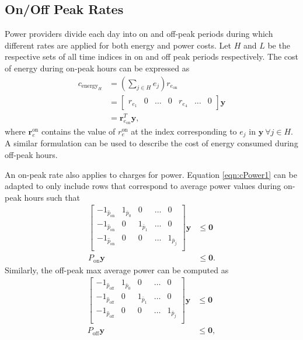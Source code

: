 \subsection{On/Off Peak Rates}
Power providers divide each day into on and off-peak periods during which different rates are applied for both energy and power costs. Let $H$ and $L$ be the respective sets of all time indices in on and off peak periods respectively. The cost of energy during on-peak hours can be expressed as 
\begin{equation}\label{eqn:cEnergy1}
	\begin{aligned}
		c_{\text{energy}_H} &= \left ( \sum_{j\in H} e_j \right ) r_{e_\text{on}} \\
		&= \begin{bmatrix}r_{e_1} & 0 & \hdots & 0 & r_{e_4} & \hdots & 0 \end{bmatrix}\mathbf{y} \\
		&= \mathbf{r}_{e_\text{on}}^T\mathbf{y},
	\end{aligned}
\end{equation}
where $\mathbf{r}^\text{on}_{e}$ contains the value of $r^\text{on}_{e}$ at the index corresponding to $e_j$ in $\mathbf{y} \ \forall j \in H$. A similar formulation can be used to describe the cost of energy consumed during off-peak hours.  
\par An on-peak rate also applies to charges for power. Equation \ref{eqn:cPower1} can be adapted to only include rows that correspond to average power values during on-peak hours such that
\begin{equation}\label{eqn:cPOnPeak} 
	\begin{aligned}
		 \begin{bmatrix} 
			 -1_{\hat{p}_\text{on}} & 1_{\bar{p}_0} & 0             & \hdots & 0 \\ 
			 -1_{\hat{p}_\text{on}} & 0       & 1_{\bar{p}_1} & \hdots & 0\\
			 -1_{\hat{p}_\text{on}} & 0       & 0 & \hdots    & 1_{\bar{p}_j} \\
		 \end{bmatrix}\mathbf{y} &\le \mathbf{0} \\ 
		 P_{\text{on}}\mathbf{y} &\le \mathbf{0}.  
	\end{aligned}
\end{equation}
Similarly, the off-peak max average power can be computed as  
\begin{equation}\label{eqn:cPOffPeak}
	\begin{aligned}
		 \begin{bmatrix} 
			 -1_{\hat{p}_\text{off}} & 1_{\bar{p}_0} & 0             & \hdots & 0 \\ 
			 -1_{\hat{p}_\text{off}} & 0       & 1_{\bar{p}_1} & \hdots & 0\\
			 -1_{\hat{p}_\text{off}} & 0       & 0 & \hdots    & 1_{\bar{p}_j} \\
		 \end{bmatrix}\mathbf{y} &\le \mathbf{0} \\ 
		 P_{\text{off}}\mathbf{y} &\le \mathbf{0},  
	\end{aligned}
\end{equation}
